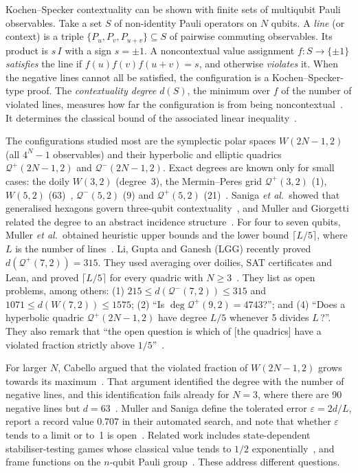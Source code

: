 \documentclass[aps,pra,onecolumn,11pt,superscriptaddress,nofootinbib]{revtex4-2}
\theoremstyle{definition}
\theoremstyle{remark}
\newcommand{\Qp}{\mathcal{Q}^{+}}
\newcommand{\Qm}{\mathcal{Q}^{-}}
\begin{document}
Kochen--Specker contextuality can be shown with finite sets of multiqubit Pauli
observables. Take a set $S$ of non-identity Pauli operators on $N$ qubits. A \emph{line} (or
context) is a triple $\{P_u,P_v,P_{u+v}\}\subseteq S$ of pairwise commuting observables. Its
product is $s\,I$ with a sign $s=\pm1$. A noncontextual value assignment $f:S\to\{\pm1\}$
\emph{satisfies} the line if $f(u)f(v)f(u+v)=s$, and otherwise \emph{violates} it. When the
negative lines cannot all be satisfied, the configuration is a Kochen--Specker-type proof.
The \emph{contextuality degree} $d(S)$, the minimum over $f$ of the number of violated lines,
measures how far the configuration is from being noncontextual~\cite{deBoutray2022}. It
determines the classical bound of the associated linear inequality~\cite{deBoutray2022,Muller2024}.

The configurations studied most are the symplectic polar spaces $W(2N-1,2)$ (all
$4^N-1$ observables) and their hyperbolic and elliptic quadrics $\Qp(2N-1,2)$ and
$\Qm(2N-1,2)$. Exact degrees are known only for small cases: the doily
$W(3,2)$ (degree~3), the Mermin--Peres grid $\Qp(3,2)$ (1), $W(5,2)$
(63)~\cite{deBoutray2022,Muller2024}, $\Qm(5,2)$ (9) and $\Qp(5,2)$
(21)~\cite{deBoutray2022}. Saniga \emph{et al.}\ showed that generalised hexagons
govern three-qubit contextuality~\cite{Saniga2025hex}, and Muller and Giorgetti related the
degree to an abstract incidence structure~\cite{MullerGiorgetti2025}. For four to seven qubits,
Muller \emph{et al.}\ obtained heuristic upper bounds and the lower bound $\lceil L/5\rceil$,
where $L$ is the number of lines~\cite{Muller2025heur}. Li, Gupta and Ganesh (LGG) recently
proved $d(\Qp(7,2))=315$. They used averaging over doilies, SAT certificates and Lean, and
proved $\lceil L/5\rceil$ for every quadric with $N\ge3$~\cite{LGG2026}. They list as open
problems, among others: (1) $215\le d(\Qm(7,2))\le 315$ and $1071\le d(W(7,2))\le 1575$;
(2) ``Is $\deg\Qp(9,2)=4743$?''; and (4) ``Does a hyperbolic quadric $\Qp(2N-1,2)$ have degree
$L/5$ whenever 5 divides $L$\,?''. They also remark that ``the open question is which of
[the quadrics] have a violated fraction strictly above $1/5$''~\cite{LGG2026}.

For larger $N$, Cabello argued that the violated fraction of $W(2N-1,2)$ grows towards its
maximum~\cite{Cabello2010}. That argument identified the degree with the number of negative
lines, and this identification fails already for $N=3$, where there are 90 negative lines but
$d=63$~\cite{deBoutray2022,Muller2024}. Muller and Saniga define the tolerated error
$\varepsilon=2d/L$, report a record value $0.707$ in their automated search, and note that
whether $\varepsilon$ tends to a limit or to~1 is open~\cite{MullerSaniga2026}. Related
work includes state-dependent stabiliser-testing games whose classical value tends to $1/2$
exponentially~\cite{Zhao2025}, and frame functions on the $n$-qubit Pauli
group~\cite{Frembs2026}. These address different questions.
\end{document}
